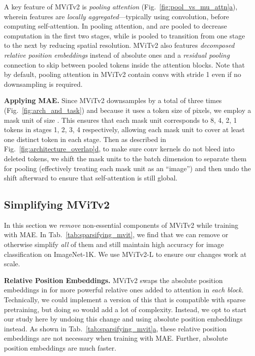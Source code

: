 \documentclass[nohyperref]{article}
\renewcommand{\paragraph}[1]{\vspace{1.25mm}\noindent\textbf{#1}}
\theoremstyle{plain}
\theoremstyle{definition}
\theoremstyle{remark}
\begin{document}
A key feature of MViTv2 is \textit{pooling attention} (Fig.~\ref{fig:pool_vs_mu_attn}\hyperref[fig:pool_vs_mu_attn]{a}), wherein features are \textit{locally aggregated}---typically using  convolution, before computing self-attention. In pooling attention,  and  are pooled to decrease computation in the first two stages, while  is pooled to transition from one stage to the next by reducing spatial resolution.
MViTv2 also features \textit{decomposed relative position embeddings} instead of absolute ones and a \textit{residual pooling} connection to skip between pooled  tokens inside the attention blocks. Note that by default, pooling attention in MViTv2 contain convs with stride 1 even if no downsampling is required.

\paragraph{Applying MAE.}
Since MViTv2 downsamples by  a total of three times (Fig.~\ref{fig:arch_and_task}) and because it uses a token size of  pixels, we employ a mask unit of size . This ensures that each mask unit corresponds to 8, 4, 2, 1 tokens in stages 1, 2, 3, 4 respectively, allowing each mask unit to cover at least one distinct token in each stage. Then as described in Fig.~\ref{fig:architecture_overlap}\hyperref[fig:architecture_overlap]{d}, to make sure conv kernels do not bleed into deleted tokens, we shift the mask units to the batch dimension to separate them for pooling (effectively treating each mask unit as an ``image'') and then undo the shift afterward to ensure that self-attention is still global.

\subsection{Simplifying MViTv2} \label{subsec:approach_arch}
In this section we \textit{remove} non-essential components of MViTv2 while training with MAE. In Tab.~\ref{tab:sparsifying_mvit}, we find that we can remove or otherwise simplify \textit{all} of them and still maintain high accuracy for image classification on ImageNet-1K. We use MViTv2-L to ensure our changes work at scale.

\paragraph{Relative Position Embeddings.}
MViTv2 swaps the absolute position embeddings in \citet{vit} for more powerful relative ones added to attention in \textit{each block}. Technically, we could implement a version of this that is compatible with sparse pretraining, but doing so would add a lot of complexity. Instead, we opt to start our study here by undoing this change and using absolute position embeddings instead. As shown in Tab.~\ref{tab:sparsifying_mvit}\hyperref[tab:sparsifying_mvit]{a}, these relative position embeddings are not necessary when training with MAE. Further, absolute position embeddings are much faster.
\end{document}
